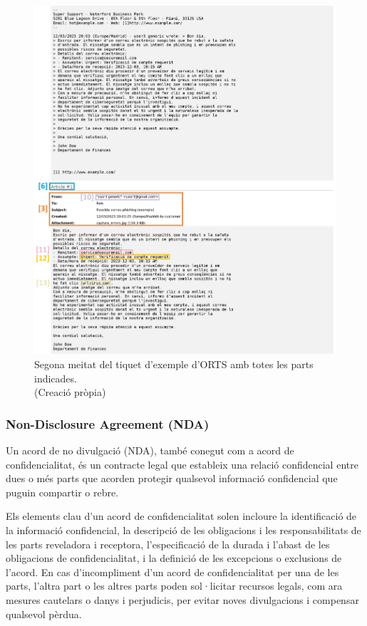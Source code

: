 \begin{figure}[H]
    \centering
    \includegraphics[width=\textwidth]{meitat-2.png}
    \caption[Segona meitat del tiquet d'exemple d'ORTS]{Segona meitat del tiquet d'exemple d'ORTS amb totes les parts indicades. \\ (Creació pròpia)}
    \label{fig:tiquet-exemple-2}
\end{figure}


\subsubsection{Non-Disclosure Agreement (NDA)}
Un acord de no divulgació (NDA), també conegut com a acord de confidencialitat, és un contracte legal que estableix una relació confidencial entre dues o més parts que acorden protegir qualsevol informació confidencial que puguin compartir o rebre.

Els elements clau d'un acord de confidencialitat solen incloure la identificació de la informació confidencial, la descripció de les obligacions i les responsabilitats de les parts reveladora i receptora, l'especificació de la durada i l'abast de les obligacions de confidencialitat, i la definició de les excepcions o exclusions de l'acord. En cas d'incompliment d'un acord de confidencialitat per una de les parts, l'altra part o les altres parts poden sol·licitar recursos legals, com ara mesures cautelars o danys i perjudicis, per evitar noves divulgacions i compensar qualsevol pèrdua.

